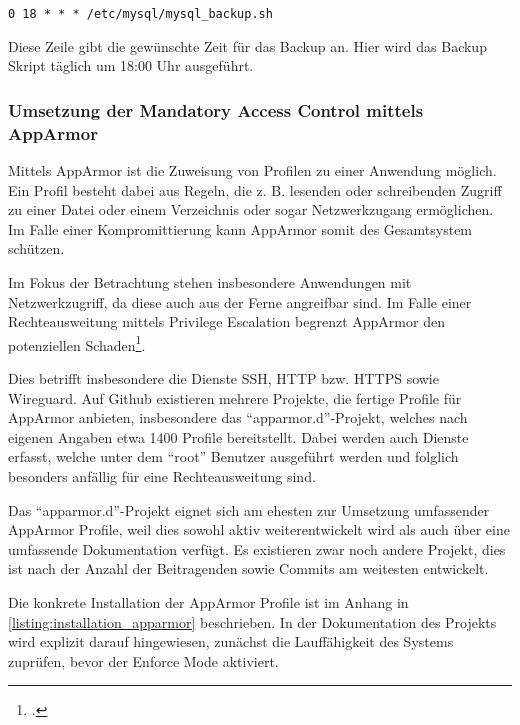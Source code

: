 \begin{verbatim}0 18 * * * /etc/mysql/mysql_backup.sh\end{verbatim}

Diese Zeile gibt die gewünschte Zeit für das Backup an. Hier wird das Backup Skript täglich um 18:00 Uhr ausgeführt.



\subsubsection{Umsetzung der Mandatory Access Control mittels AppArmor}

Mittels AppArmor ist die Zuweisung von Profilen zu einer Anwendung möglich. Ein Profil besteht dabei aus Regeln, die z. B. lesenden oder schreibenden Zugriff zu einer Datei oder einem Verzeichnis oder sogar Netzwerkzugang ermöglichen. Im Falle einer Kompromittierung kann AppArmor somit des Gesamtsystem schützen.

Im Fokus der Betrachtung stehen insbesondere Anwendungen mit Netzwerkzugriff, da diese auch aus der Ferne angreifbar sind. Im Falle einer Rechteausweitung mittels Privilege Escalation begrenzt AppArmor den potenziellen Schaden\footcite[Vgl.][]{hutchinsIntelligenceDrivenComputerNetwork}.

Dies betrifft insbesondere die Dienste \ac{SSH}, \ac{HTTP} bzw. \ac{HTTPS} sowie Wireguard. Auf Github existieren mehrere Projekte, die fertige Profile für AppArmor anbieten, insbesondere das \enquote{apparmor.d}-Projekt, welches nach eigenen Angaben etwa 1400 Profile bereitstellt. Dabei werden auch Dienste erfasst, welche unter dem \enquote{root} Benutzer ausgeführt werden und folglich besonders anfällig für eine Rechteausweitung sind.

Das \enquote{apparmor.d}-Projekt eignet sich am ehesten zur Umsetzung umfassender AppArmor Profile, weil dies sowohl aktiv weiterentwickelt wird als auch über eine umfassende Dokumentation verfügt. Es existieren zwar noch andere Projekt, dies ist nach der Anzahl der Beitragenden sowie Commits am weitesten entwickelt.

Die konkrete Installation der AppArmor Profile ist im Anhang in \autoref{listing:installation_apparmor} beschrieben. In der Dokumentation des Projekts wird explizit darauf hingewiesen, zunächst die Lauffähigkeit des Systems zuprüfen, bevor der Enforce Mode aktiviert.

